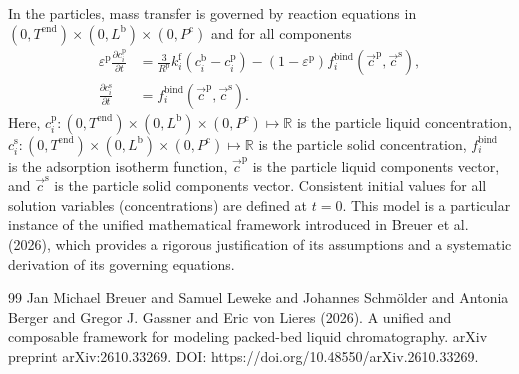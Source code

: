 \documentclass{article}
\begin{document}
In the particles, mass transfer is governed by reaction equations in $(0, T^{\mathrm{end}}) \times (0, L^{\mathrm{b}})\times (0, P^{\mathrm{c}})$ and for all components
\begin{align}
    \varepsilon^{\mathrm{p}}\frac{\partial c^{\mathrm{p}}_{i}}{\partial t}
    &= \frac{3}{R^{\mathrm{p}}} k^{\mathrm{f}}_{i} \left( c^{\mathrm{b}}_{i} - c^{\mathrm{p}}_{i} \right)
        - \left( 1 - \varepsilon^{\mathrm{p}} \right) f^{\mathrm{bind}}_{i}\left( \vec{c}^{\mathrm{p}}, \vec{c}^{\mathrm{s}} \right),
    \\
    \frac{\partial c^{\mathrm{s}}_{i}}{\partial t}
    &= f^{\mathrm{bind}}_{i}\left( \vec{c}^{\mathrm{p}}, \vec{c}^{\mathrm{s}} \right).
\end{align}
Here, $c^{\mathrm{p}}_{i}\colon (0, T^{\mathrm{end}}) \times (0, L^{\mathrm{b}})\times (0, P^{\mathrm{c}}) \mapsto \mathbb{R}$ is the particle liquid concentration, $c^{\mathrm{s}}_{i}\colon (0, T^{\mathrm{end}}) \times (0, L^{\mathrm{b}})\times (0, P^{\mathrm{c}}) \mapsto \mathbb{R}$ is the particle solid concentration, $f^{\mathrm{bind}}_{i}$ is the adsorption isotherm function, $\vec{c}^{\mathrm{p}}$ is the particle liquid components vector, and $\vec{c}^{\mathrm{s}}$ is the particle solid components vector.
Consistent initial values for all solution variables (concentrations) are defined at $t = 0$.
This model is a particular instance of the unified mathematical framework introduced in Breuer et al. (2026), which provides a rigorous justification of its assumptions and a systematic derivation of its governing equations.
\begin{thebibliography}{99}
     Jan Michael Breuer and Samuel Leweke and Johannes Schmölder and Antonia Berger and Gregor J. Gassner and Eric von Lieres (2026). A unified and composable framework for modeling packed-bed liquid chromatography. arXiv preprint arXiv:2610.33269. DOI: https://doi.org/10.48550/arXiv.2610.33269.
\end{thebibliography}
\end{document}
